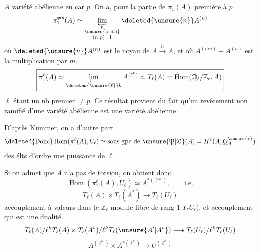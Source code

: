 $A$ variété abélienne en car $p$. On a, pour la partie de $\pi_1(A)$ première à $p$
\[
\pi_1^{\neq p}(A)\simeq\varprojlim_{\substack{n\\\text{\unsure{arith}}\\(n,p)=1}}\deleted{\unsure{n}}A^{(n)}
\]
où $\deleted{\unsure{n}}A^{(n)}$ est le noyau de $A\xrightarrow{n}A$, et où $A^{(mn)}\mathbin{-}A^{(n)}$ est la multiplication par $m$.
\[
\boxed{\pi_1^\ell(A)\simeq\varprojlim_{\deleted{\unsure{\ell}}k} A^{(\ell^k)}\simeq T_\ell(A)=\operatorname{Hom}(\mathbb Q_\ell/\mathbb Z_\ell,A)}
\]
$\ell$ étant un nb premier $\neq p$. Ce résultat provient du fait qu'un \uline{revêtement non ramifié d'une variété abélienne est une variété abélienne}

D'après Kummer, on a d'autre part
\[
\deleted{\text{Donc}}\operatorname{Hom}(\pi_1^\ell(A),U_\ell)\simeq
\text{sous-gpe de }\unsure{\mathfrak P|\mathfrak D}(A)=H^1(A,\underline O_A^{\unsure{*}})
\]
des élts d'ordre une puissance de $\ell$.

Si on admet que \uline{$A$ n'a pas de torsion}, on obtient donc
\[
\operatorname{Hom}(\pi_1^\ell(A),U_\ell)\simeq A^{*(\ell^\infty)},\qquad\text{i.e.}
\]
\[\boxed{T_\ell(A)\times T_\ell(A^*)\longrightarrow T_\ell(U_\ell)}\]
accouplement à valeurs dans le $\mathbb Z_\ell$-module libre de rang 1 $T_\ell U_\ell)$, et accouplement qui est une dualité.
\[
T_\ell(A)/\ell^kT_\ell(A)\times T_\ell(A^*)/\ell^kT_\ell(\unsure{A'|A^*})\longrightarrow
T_\ell(U_\ell)/\ell^kT_\ell(U_\ell)
\]
\[A^{(\ell^k)}\times A^{*(\ell^k)}\longrightarrow U^{(\ell^k)}\]
